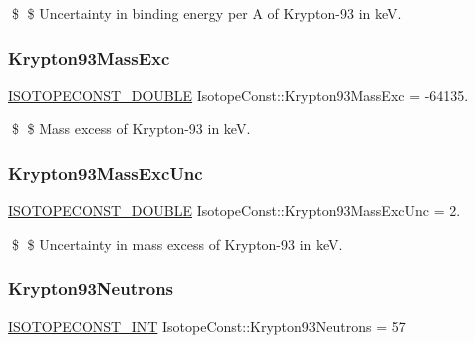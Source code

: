 \$ \$ Uncertainty in binding energy per A of Krypton-\/93 in keV. \mbox{\label{group___isotope_const-_krypton-_kr93_ga0bd92b3bb90506dab1085a4b6b076185}} 
\subsubsection{\texorpdfstring{Krypton93\+Mass\+Exc}{Krypton93MassExc}}
{\footnotesize\ttfamily \mbox{\hyperlink{group___isotope_const-_macros_ga8f45a7272ce02c0b4c65c44636ed719a}{I\+S\+O\+T\+O\+P\+E\+C\+O\+N\+S\+T\+\_\+\+D\+O\+U\+B\+LE}} Isotope\+Const\+::\+Krypton93\+Mass\+Exc = -\/64135.}

\$ \$ Mass excess of Krypton-\/93 in keV. \mbox{\label{group___isotope_const-_krypton-_kr93_ga934c518e6e6dc5553d2c82961b1fc867}} 
\subsubsection{\texorpdfstring{Krypton93\+Mass\+Exc\+Unc}{Krypton93MassExcUnc}}
{\footnotesize\ttfamily \mbox{\hyperlink{group___isotope_const-_macros_ga8f45a7272ce02c0b4c65c44636ed719a}{I\+S\+O\+T\+O\+P\+E\+C\+O\+N\+S\+T\+\_\+\+D\+O\+U\+B\+LE}} Isotope\+Const\+::\+Krypton93\+Mass\+Exc\+Unc = 2.}

\$ \$ Uncertainty in mass excess of Krypton-\/93 in keV. \mbox{\label{group___isotope_const-_krypton-_kr93_ga5596205e545192dffc608330f17145cb}} 
\subsubsection{\texorpdfstring{Krypton93\+Neutrons}{Krypton93Neutrons}}
{\footnotesize\ttfamily \mbox{\hyperlink{group___isotope_const-_macros_ga5f18360b3e99483a35c32d789e62621c}{I\+S\+O\+T\+O\+P\+E\+C\+O\+N\+S\+T\+\_\+\+I\+NT}} Isotope\+Const\+::\+Krypton93\+Neutrons = 57}


